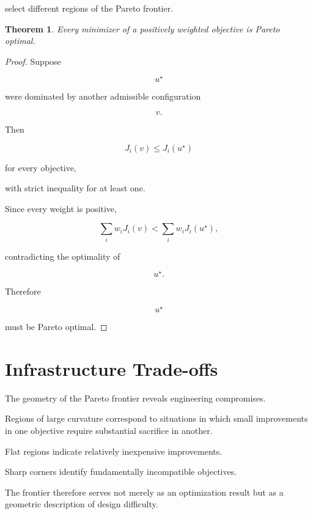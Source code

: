\documentclass[11pt,fleqn]{book}
\numberwithin{equation}{chapter}
\theoremstyle{plain}
\newtheorem{theorem}{Theorem}[chapter]
\theoremstyle{definition}
\theoremstyle{remark}
\begin{document}
select different regions of the Pareto frontier.


\begin{theorem}

Every minimizer of a positively weighted objective is Pareto optimal.

\end{theorem}

\begin{proof}

Suppose

\[
u^\star
\]

were dominated by another admissible configuration

\[
v.
\]

Then

\[
J_i(v)
\le
J_i(u^\star)
\]

for every objective,

with strict inequality for at least one.

Since every weight is positive,

\[
\sum_i
w_iJ_i(v)
<
\sum_i
w_iJ_i(u^\star),
\]

contradicting the optimality of

\[
u^\star.
\]

Therefore

\[
u^\star
\]

must be Pareto optimal.

\end{proof}


\section{Infrastructure Trade-offs}

The geometry of the Pareto frontier reveals engineering compromises.

Regions of large curvature correspond to situations in which small
improvements in one objective require substantial sacrifice in another.

Flat regions indicate relatively inexpensive improvements.

Sharp corners identify fundamentally incompatible objectives.

The frontier therefore serves not merely as an optimization result but
as a geometric description of design difficulty.
\end{document}
